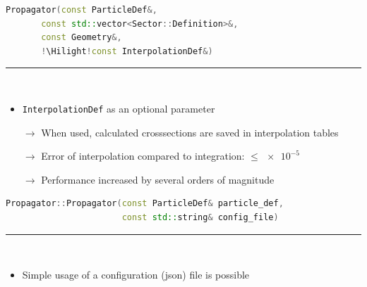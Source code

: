 \documentclass[aspectratio=1610, captions=tableheading, 11pt]{beamer}
\newcommand{\Hilight}{\makebox[0pt][l]{\color{tugreen}\rule[-4pt]{0.65\linewidth}{14pt}}}
\begin{document}
\begin{frame}[fragile]
\begin{lstlisting}[language=C++,basicstyle=\ttfamily,keywordstyle=\color{red}, escapechar=\!]
Propagator(const ParticleDef&,
	   const std::vector<Sector::Definition>&,
	   const Geometry&,
	   !\Hilight!const InterpolationDef&)
\end{lstlisting}
	\textcolor{tugreen}{\rule{\textwidth}{1pt}}\\%
    \begin{itemize}
      \setlength\itemsep{0.5em}
      \item \texttt{InterpolationDef} as an optional parameter
      \item [$\rightarrow$] When used, calculated crosssections are saved in interpolation tables
      \item [$\rightarrow$] Error of interpolation compared to integration: $\leq \num{e-5}$
      \item [$\rightarrow$] Performance increased by several orders of magnitude
    \end{itemize}
\end{frame}

\begin{frame}[fragile]
\begin{lstlisting}[language=C++,basicstyle=\ttfamily,keywordstyle=\color{red}, escapechar=\!]
Propagator::Propagator(const ParticleDef& particle_def, 
                       const std::string& config_file)
\end{lstlisting}
	\textcolor{tugreen}{\rule{\textwidth}{1pt}}\\%
    \begin{itemize}
      \setlength\itemsep{0.5em}
      \item Simple usage of a configuration (json) file is possible
    \end{itemize}
\end{frame}
\end{document}
